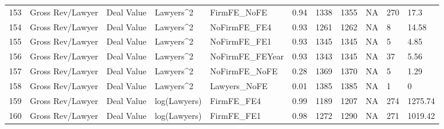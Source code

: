 \begin{table}[ht]
\begin{tabular}{rllllllllll}
  153 & Gross Rev/Lawyer & Deal Value & Lawyers^2 & FirmFE\_NoFE & 0.94 & 1338 & 1355 & NA & 270 & 17.3 \\ 
  154 & Gross Rev/Lawyer & Deal Value & Lawyers^2 & NoFirmFE\_FE4 & 0.93 & 1261 & 1262 & NA & 8 & 14.58 \\ 
  155 & Gross Rev/Lawyer & Deal Value & Lawyers^2 & NoFirmFE\_FE1 & 0.93 & 1345 & 1345 & NA & 5 & 4.85 \\ 
  156 & Gross Rev/Lawyer & Deal Value & Lawyers^2 & NoFirmFE\_FEYear & 0.93 & 1343 & 1345 & NA & 37 & 5.56 \\ 
  157 & Gross Rev/Lawyer & Deal Value & Lawyers^2 & NoFirmFE\_NoFE & 0.28 & 1369 & 1370 & NA & 5 & 1.29 \\ 
  158 & Gross Rev/Lawyer & Deal Value & Lawyers^2 & Lawyers\_NoFE & 0.01 & 1385 & 1385 & NA & 1 & 0 \\ 
  159 & Gross Rev/Lawyer & Deal Value & log(Lawyers) & FirmFE\_FE4 & 0.99 & 1189 & 1207 & NA & 274 & 1275.74 \\ 
  160 & Gross Rev/Lawyer & Deal Value & log(Lawyers) & FirmFE\_FE1 & 0.98 & 1272 & 1290 & NA & 271 & 1019.42 \\ 
   \hline
\end{tabular}
\end{table}
